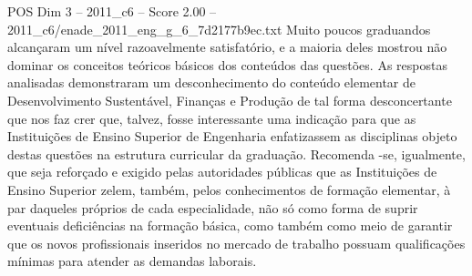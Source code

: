 \begin{textsample}{POS Dim 3 – 2011\_c6 – Score 2.00 – 2011\_c6/enade\_2011\_eng\_g\_6\_7d2177b9ec.txt}
Muito poucos graduandos alcançaram um nível razoavelmente satisfatório, e a maioria deles mostrou não dominar os conceitos teóricos básicos dos conteúdos das questões.
As respostas analisadas demonstraram um desconhecimento do conteúdo elementar de Desenvolvimento Sustentável, Finanças e Produção de tal forma desconcertante que nos faz crer que, talvez, fosse interessante uma indicação para que as Instituições de Ensino Superior de Engenharia enfatizassem as disciplinas objeto destas questões na estrutura curricular da graduação.
Recomenda -se, igualmente, que seja reforçado e exigido pelas autoridades públicas que as Instituições de Ensino Superior zelem, também, pelos conhecimentos de formação elementar, à par daqueles próprios de cada especialidade, não só como forma de suprir eventuais deficiências na formação básica, como também como meio de garantir que os novos profissionais inseridos no mercado de trabalho possuam qualificações mínimas para atender as demandas laborais.

\end{textsample}
